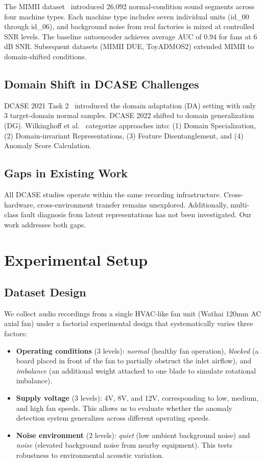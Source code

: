 \documentclass[sigconf]{acmart}
\begin{document}
The MIMII dataset~\cite{purohit2019mimii} introduced 26,092 normal-condition sound segments across four machine types. Each machine type includes seven individual units (id\_00 through id\_06), and background noise from real factories is mixed at controlled SNR levels. The baseline autoencoder achieves average AUC of 0.94 for fans at 6 dB SNR. Subsequent datasets (MIMII DUE, ToyADMOS2) extended MIMII to domain-shifted conditions.

\subsection{Domain Shift in DCASE Challenges}

DCASE 2021 Task 2~\cite{kawaguchi2021dcase} introduced the domain adaptation (DA) setting with only 3 target-domain normal samples. DCASE 2022 shifted to domain generalization (DG). Wilkinghoff et al.~\cite{wilkinghoff2025domainshift} categorize approaches into: (1) Domain Specialization, (2) Domain-invariant Representations, (3) Feature Disentanglement, and (4) Anomaly Score Calculation.

\subsection{Gaps in Existing Work}

All DCASE studies operate within the same recording infrastructure. Cross-hardware, cross-environment transfer remains unexplored. Additionally, multi-class fault diagnosis from latent representations has not been investigated. Our work addresses both gaps.

\section{Experimental Setup}
\label{sec:setup}

\subsection{Dataset Design}

We collect audio recordings from a single HVAC-like fan unit (Wathai 120mm AC axial fan) under a factorial experimental design that systematically varies three factors:

\begin{itemize}
    \item \textbf{Operating conditions} (3 levels): \emph{normal} (healthy fan operation), \emph{blocked} (a board placed in front of the fan to partially obstruct the inlet airflow), and \emph{imbalance} (an additional weight attached to one blade to simulate rotational imbalance).
    \item \textbf{Supply voltage} (3 levels): 4V, 8V, and 12V, corresponding to low, medium, and high fan speeds. This allows us to evaluate whether the anomaly detection system generalizes across different operating speeds.
    \item \textbf{Noise environment} (2 levels): \emph{quiet} (low ambient background noise) and \emph{noise} (elevated background noise from nearby equipment). This tests robustness to environmental acoustic variation.
\end{itemize}
\end{document}
